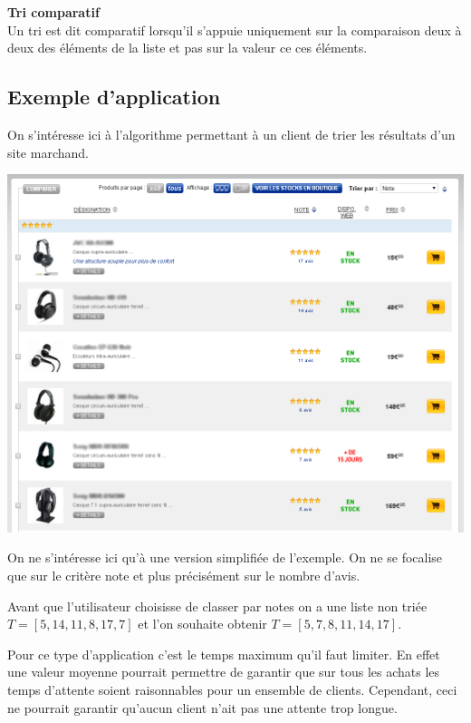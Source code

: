 \begin{defi}\textbf{Tri comparatif} \\
Un tri est dit comparatif lorsqu'il s'appuie uniquement sur la comparaison deux à deux des éléments de la liste et pas sur la valeur ce ces éléments.
\end{defi}


\subsection{Exemple d'application}

\begin{exemple2}

On s'intéresse ici à l'algorithme permettant à un client de trier les résultats d'un site marchand.

\begin{center}
\includegraphics[width=.8\textwidth]{images/illustration.png}
\end{center}

On ne s'intéresse ici qu'à une version simplifiée de l'exemple. On ne se focalise que sur le critère note et plus précisément sur le nombre d'avis.

Avant que l'utilisateur choisisse de classer par notes on a une liste non triée $T=[5,14,11,8,17,7]$ et l'on souhaite obtenir $T=[5,7,8,11,14,17]$.

Pour ce type d'application c'est le temps maximum qu'il faut limiter. En effet une valeur moyenne pourrait permettre de garantir que sur tous les achats les temps d'attente soient raisonnables pour un ensemble de clients. Cependant, ceci ne pourrait garantir qu'aucun client n'ait pas une attente trop longue.

\end{exemple2}



